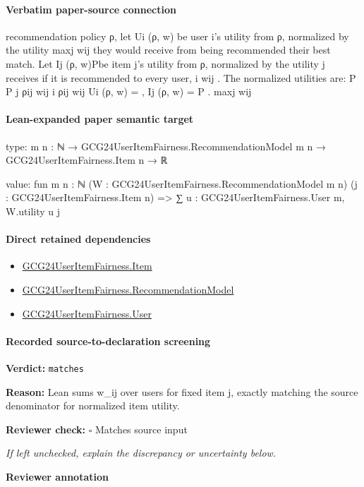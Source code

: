 \documentclass[10pt]{article}
\newcommand{\reviewerbox}{%
  \par\noindent\fbox{\parbox{0.96\linewidth}{\rule{0pt}{0.38in}}}\par
}
\newcommand{\reviewmatch}[1]{%
  \par\noindent\textbf{Reviewer check:} $\square$\; #1\par
  \noindent\emph{If left unchecked, explain the discrepancy or uncertainty below.}\par
}
\begin{document}
\paragraph{Verbatim paper-source connection}
\begin{ReviewVerbatim}
recommendation policy ρ, let Ui (ρ, w) be user i’s utility from ρ, normalized by the utility maxj wij
they would receive from being recommended their best match. Let Ij (ρ, w)Pbe item j’s utility from
ρ, normalized by the utility j receives if it is recommended to every user, i wij . The normalized
utilities are:
P
P
j ρij wij
i ρij wij
Ui (ρ, w) =
, Ij (ρ, w) = P
.
maxj wij
\end{ReviewVerbatim}



\paragraph{Lean-expanded paper semantic target}
\begin{ReviewVerbatim}
type:
{m n : ℕ} → GCG24UserItemFairness.RecommendationModel m n → GCG24UserItemFairness.Item n → ℝ

value:
fun {m n : ℕ} (W : GCG24UserItemFairness.RecommendationModel m n) (j : GCG24UserItemFairness.Item n) =>
  ∑ u : GCG24UserItemFairness.User m, W.utility u j
\end{ReviewVerbatim}

\paragraph{Direct retained dependencies}
\begin{itemize}\raggedright
\item \hyperlink{governing-declaration-a7c560a429c6e204}{GCG24\allowbreak{}User\allowbreak{}Item\allowbreak{}Fairness.\allowbreak{}Item}
\item \hyperlink{governing-declaration-4b845f20f80fb146}{GCG24\allowbreak{}User\allowbreak{}Item\allowbreak{}Fairness.\allowbreak{}Recommendation\allowbreak{}Model}
\item \hyperlink{governing-declaration-800dd691bc989470}{GCG24\allowbreak{}User\allowbreak{}Item\allowbreak{}Fairness.\allowbreak{}User}
\end{itemize}
\paragraph{Recorded source-to-declaration screening}
\textbf{Verdict:} \texttt{matches}
\\
{\raggedright
\textbf{Reason:} Lean sums w\_\allowbreak{}ij over users for fixed item j, exactly matching the source denominator for normalized item utility.\allowbreak{}
\par}
\reviewmatch{Matches source input}
\noindent\textbf{Reviewer annotation}\par
\reviewerbox
\clearpage
\hypertarget{paper-prerequisite-9f46fc286907aebf}{}
\end{document}
